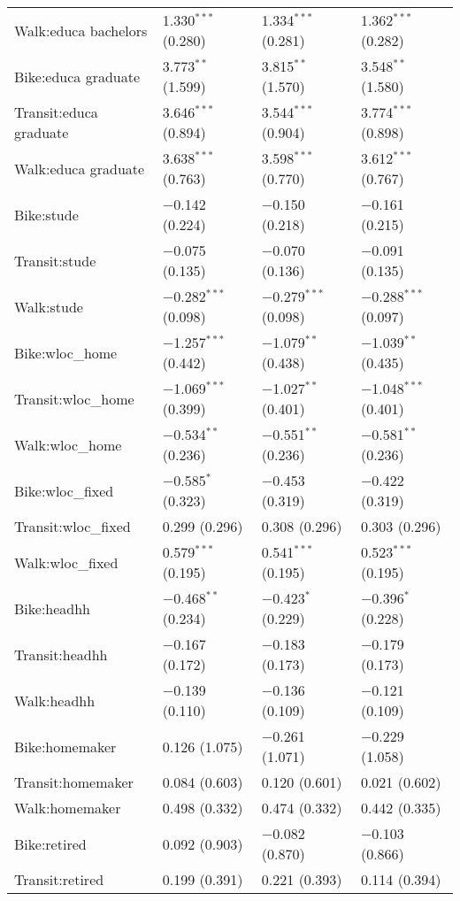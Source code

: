 \begin{longtabu}{llll}
  Walk:educa bachelors & 1.330$^{***}$ (0.280) & 1.334$^{***}$ (0.281) & 1.362$^{***}$ (0.282) \\ 
  Bike:educa graduate & 3.773$^{**}$ (1.599) & 3.815$^{**}$ (1.570) & 3.548$^{**}$ (1.580) \\ 
  Transit:educa graduate & 3.646$^{***}$ (0.894) & 3.544$^{***}$ (0.904) & 3.774$^{***}$ (0.898) \\ 
  Walk:educa graduate & 3.638$^{***}$ (0.763) & 3.598$^{***}$ (0.770) & 3.612$^{***}$ (0.767) \\ 
  Bike:stude & $-$0.142 (0.224) & $-$0.150 (0.218) & $-$0.161 (0.215) \\ 
  Transit:stude & $-$0.075 (0.135) & $-$0.070 (0.136) & $-$0.091 (0.135) \\ 
  Walk:stude & $-$0.282$^{***}$ (0.098) & $-$0.279$^{***}$ (0.098) & $-$0.288$^{***}$ (0.097) \\ 
  Bike:wloc\_home & $-$1.257$^{***}$ (0.442) & $-$1.079$^{**}$ (0.438) & $-$1.039$^{**}$ (0.435) \\ 
  Transit:wloc\_home & $-$1.069$^{***}$ (0.399) & $-$1.027$^{**}$ (0.401) & $-$1.048$^{***}$ (0.401) \\ 
  Walk:wloc\_home & $-$0.534$^{**}$ (0.236) & $-$0.551$^{**}$ (0.236) & $-$0.581$^{**}$ (0.236) \\ 
  Bike:wloc\_fixed & $-$0.585$^{*}$ (0.323) & $-$0.453 (0.319) & $-$0.422 (0.319) \\ 
  Transit:wloc\_fixed & 0.299 (0.296) & 0.308 (0.296) & 0.303 (0.296) \\ 
  Walk:wloc\_fixed & 0.579$^{***}$ (0.195) & 0.541$^{***}$ (0.195) & 0.523$^{***}$ (0.195) \\ 
  Bike:headhh & $-$0.468$^{**}$ (0.234) & $-$0.423$^{*}$ (0.229) & $-$0.396$^{*}$ (0.228) \\ 
  Transit:headhh & $-$0.167 (0.172) & $-$0.183 (0.173) & $-$0.179 (0.173) \\ 
  Walk:headhh & $-$0.139 (0.110) & $-$0.136 (0.109) & $-$0.121 (0.109) \\ 
  Bike:homemaker & 0.126 (1.075) & $-$0.261 (1.071) & $-$0.229 (1.058) \\ 
  Transit:homemaker & 0.084 (0.603) & 0.120 (0.601) & 0.021 (0.602) \\ 
  Walk:homemaker & 0.498 (0.332) & 0.474 (0.332) & 0.442 (0.335) \\ 
  Bike:retired & 0.092 (0.903) & $-$0.082 (0.870) & $-$0.103 (0.866) \\ 
  Transit:retired & 0.199 (0.391) & 0.221 (0.393) & 0.114 (0.394) \\ 

\end{longtabu}
